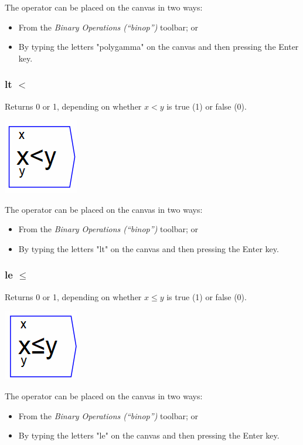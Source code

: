 The operator can be placed on the canvas in two ways:
\begin{itemize}
\item From the \emph{Binary Operations (``binop'')} toolbar; or 
\item By typing the letters "polygamma" on the canvas and then pressing
the Enter key.
\end{itemize}

\subsubsection{lt $<$}

\label{Operation:lt} Returns 0 or 1, depending on whether $x<y$
is true (1) or false (0).

\includegraphics{images/LessThanKey}

The operator can be placed on the canvas in two ways:
\begin{itemize}
\item From the \emph{Binary Operations (``binop'')} toolbar; or 
\item By typing the letters "lt" on the canvas and then pressing the Enter
key. 
\end{itemize}

\subsubsection{le $\le$}

\label{Operation:le} Returns 0 or 1, depending on whether $x\le y$
is true (1) or false (0).

\includegraphics{images/LessEqualKey}

The operator can be placed on the canvas in two ways:
\begin{itemize}
\item From the \emph{Binary Operations (``binop'')} toolbar; or 
\item By typing the letters "le" on the canvas and then pressing the Enter
key. 
\end{itemize}

